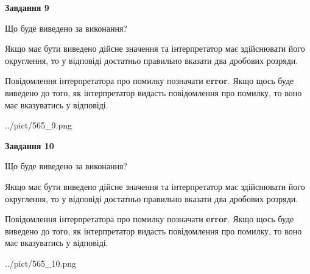 \documentclass[12pt, ukrainian]{article}
\begin{document}
{\begin {Large}
{\begin {center}\textbf{Завдання 9}\end {center}}\par
Що буде виведено за виконання? \par

Якщо має бути виведено дійсне значення та інтерпретатор має здійснювати його округлення, 
то у відповіді достатньо правильно вказати два дробових розряди.

Повідомлення інтерпретатора про помилку позначати \textbf{error}.
Якщо щось буде виведено до того, як інтерпретатор видасть повідомлення про помилку, 
то воно має вказуватись у відповіді. \par

\begin{center}
	{../pict/565_9.png}
\end{center}
\newpage

{\begin {center}\textbf{Завдання 10}\end {center}}\par
Що буде виведено за виконання? \par

Якщо має бути виведено дійсне значення та інтерпретатор має здійснювати його округлення, 
то у відповіді достатньо правильно вказати два дробових розряди.

Повідомлення інтерпретатора про помилку позначати \textbf{error}.
Якщо щось буде виведено до того, як інтерпретатор видасть повідомлення про помилку, 
то воно має вказуватись у відповіді. \par

\begin{center}
	{../pict/565_10.png}
\end{center}
\newpage

\end {Large}}
\end{document}
